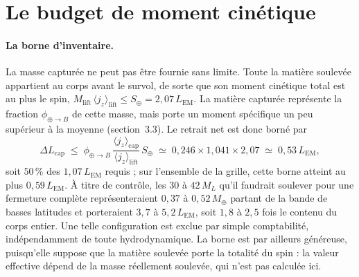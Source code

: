 \documentclass[11pt,a4paper]{article}
\begin{document}
\section{Le budget de moment cinétique}

\noindent{}

\paragraph{La borne d'inventaire.}
La masse capturée ne peut pas être fournie sans limite. Toute la matière soulevée appartient au corps avant le survol, de sorte que son moment cinétique total est au plus le spin, $M_{\mathrm{lift}}\,\langle j_z\rangle_{\mathrm{lift}} \le S_\oplus = 2{,}07\,L_{\mathrm{EM}}$. La matière capturée représente la fraction $\phi_{\oplus\to B}$ de cette masse, mais porte un moment spécifique un peu supérieur à la moyenne (section~3.3). Le retrait net est donc borné par
\begin{equation}
\Delta L_{\mathrm{cap}} \;\le\; \phi_{\oplus\to B}\,\frac{\langle j_z\rangle_{\mathrm{cap}}}{\langle j_z\rangle_{\mathrm{lift}}}\,S_\oplus \;\simeq\; 0{,}246 \times 1{,}041 \times 2{,}07 \;\simeq\; 0{,}53\,L_{\mathrm{EM}},
\end{equation}
soit $50\,\%$ des $1{,}07\,L_{\mathrm{EM}}$ requis ; sur l'ensemble de la grille, cette borne atteint au plus $0{,}59\,L_{\mathrm{EM}}$. À titre de contrôle, les $30$ à $42\,M_L$ qu'il faudrait soulever pour une fermeture complète représenteraient $0{,}37$ à $0{,}52\,M_\oplus$ partant de la bande de basses latitudes et porteraient $3{,}7$ à $5{,}2\,L_{\mathrm{EM}}$, soit $1{,}8$ à $2{,}5$ fois le contenu du corps entier. Une telle configuration est exclue par simple comptabilité, indépendamment de toute hydrodynamique. La borne est par ailleurs généreuse, puisqu'elle suppose que la matière soulevée porte la totalité du spin : la valeur effective dépend de la masse réellement soulevée, qui n'est pas calculée ici.
\end{document}
